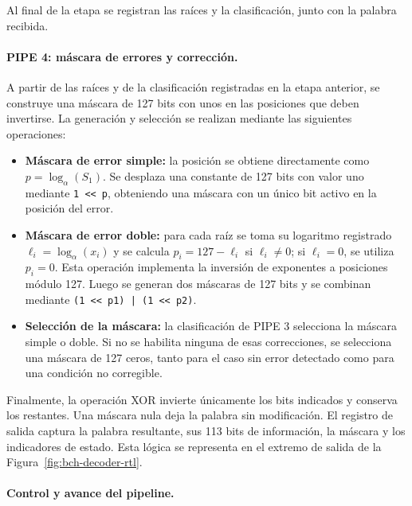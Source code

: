 \documentclass[10pt,a4paper]{article}
\begin{document}
Al final de la etapa se registran las raíces y la clasificación, 
junto con la palabra recibida.

\paragraph{PIPE 4: máscara de errores y corrección.}
A partir de las raíces y de la clasificación registradas en la etapa
anterior, se construye una máscara de 127 bits con unos en las
posiciones que deben invertirse. La generación y selección se realizan
mediante las siguientes operaciones:

\begin{itemize}
    \item \textbf{Máscara de error simple:} la posición se obtiene
    directamente como $p=\log_{\alpha}(S_1)$. Se desplaza una constante
    de 127 bits con valor uno mediante \lstinline!1 << p!, obteniendo
    una máscara con un único bit activo en la posición del error.

    \item \textbf{Máscara de error doble:} para cada raíz se toma su
    logaritmo registrado $\ell_i=\log_{\alpha}(x_i)$ y se calcula
    $p_i=127-\ell_i$ si $\ell_i\neq0$; si $\ell_i=0$, se utiliza
    $p_i=0$. Esta operación implementa la inversión de exponentes
    a posiciones módulo 127. Luego se generan dos máscaras de
    127 bits y se combinan mediante
    \lstinline!(1 << p1) | (1 << p2)!.

    \item \textbf{Selección de la máscara:} la clasificación de PIPE 3
    selecciona la máscara simple o doble. Si no se habilita ninguna
    de esas correcciones, se selecciona una máscara de 127 ceros,
    tanto para el caso sin error detectado como para una condición
    no corregible.
\end{itemize}

Finalmente, la operación XOR invierte únicamente los bits indicados 
y conserva los restantes. Una máscara nula deja la palabra sin 
modificación. El registro de salida captura la palabra resultante, 
sus 113 bits de información, la máscara y los indicadores de estado. 
Esta lógica se representa en el extremo de salida de la Figura~\ref{fig:bch-decoder-rtl}.

\paragraph{Control y avance del pipeline.}
\end{document}
